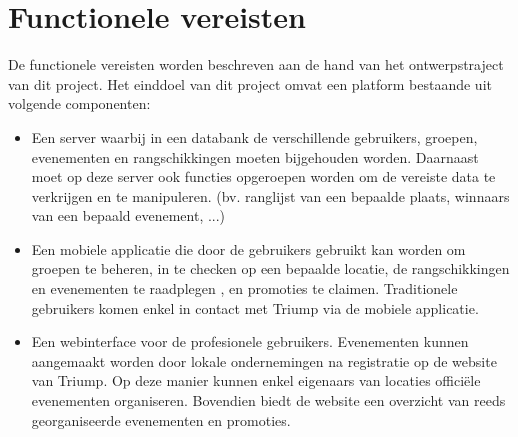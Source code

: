 \section{Functionele vereisten}
De functionele vereisten worden beschreven aan de hand van het ontwerpstraject van dit project.
Het einddoel van dit project omvat een platform bestaande uit volgende componenten: 
\begin{itemize}
	
	\item Een server waarbij in een databank de verschillende gebruikers, groepen, evenementen en rangschikkingen moeten bijgehouden worden. Daarnaast moet op deze server ook functies opgeroepen worden om de vereiste data te verkrijgen en te manipuleren. (bv. ranglijst van een bepaalde plaats, winnaars van een bepaald evenement, ...)
	\item Een mobiele applicatie die door de gebruikers gebruikt kan worden om groepen te beheren, in te checken op een bepaalde locatie, de rangschikkingen en evenementen te raadplegen , en promoties te claimen. Traditionele gebruikers komen enkel in contact met Triump via de mobiele applicatie. 
	\item Een webinterface voor de profesionele gebruikers. Evenementen kunnen aangemaakt worden door lokale ondernemingen na registratie op de website van Triump. Op deze manier kunnen enkel eigenaars van locaties officiële evenementen organiseren. Bovendien biedt de website een overzicht van reeds georganiseerde evenementen en promoties.
	
\end{itemize}
